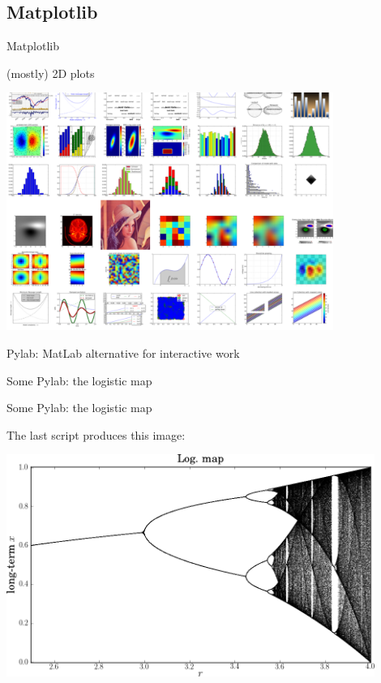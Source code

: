 \subsection{Matplotlib}

\begin{frame}{Matplotlib}

(mostly) 2D plots

\begin{center}
\includegraphics[width=0.8\textwidth]{Figures/mpl}
\end{center}

Pylab: MatLab alternative for interactive work
\end{frame}


\begin{frame}{Some Pylab: the logistic map}

\end{frame}

\begin{frame}{Some Pylab: the logistic map}

The last script produces this image:

\begin{center}
	\includegraphics[width=0.9\textwidth]{Figures/logMap}
\end{center}

\end{frame}
